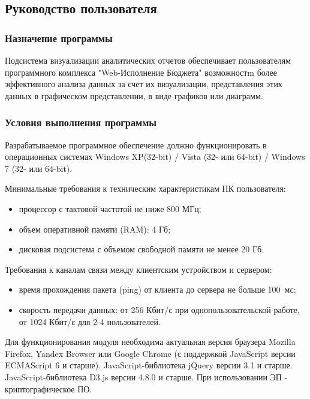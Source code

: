 \documentclass[a4paper]{extarticle}
\numberwithin{equation}{section}
\begin{document}
\subsection{Руководство пользователя}

\subsubsection{Назначение программы}
Подсистема визуализации аналитических отчетов обеспечивает пользователям программного комплекса "Web-Исполнение Бюджета" возможностm более эффективного анализа данных за счет их визуализации, представления этих данных в графическом представлении, в виде графиков или диаграмм.

\subsubsection{Условия выполнения программы}
Разрабатываемое программное обеспечение должно функционировать в операционных системах Windows XP(32-bit) / Vista (32- или 64-bit) / Windows 7 (32- или 64-bit).\par
Минимальные требования к техническим характеристикам ПК пользователя:\par
\begin{itemize}
  \item процессор с тактовой частотой не ниже 800 МГц;
  \item объем оперативной памяти (RAM): 4 Гб;
  \item дисковая подсистема с объемом свободной памяти не менее 20 Гб.
\end{itemize}\par
Требования к каналам связи между клиентским устройством и сервером:\par
\begin{itemize}
  \item время прохождения пакета (ping) от клиента до сервера не больше 100~мс;
  \item скорость передачи данных: от 256 Кбит/с при однопользовательской работе, от 1024 Кбит/с для 2-4 пользователей.
\end{itemize}\par
Для функционирования модуля необходима актуальная версия браузера Mozilla Firefox, Yandex Browser или Google Chrome (с поддержкой JavaScript версии ECMAScript 6 и старше). JavaScript-библиотека jQuery версии 3.1 и старше. JavaScript-библиотека D3.js версии 4.8.0 и старше. При использовании ЭП - криптографическое ПО.
\end{document}
